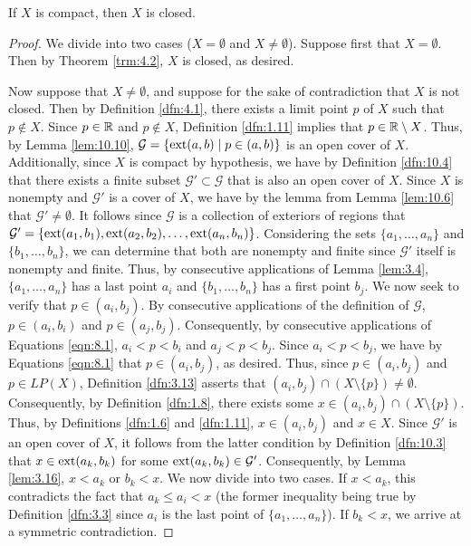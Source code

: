 \documentclass[../main.tex]{subfiles}
\begin{document}
\begin{theorem}\label{trm:10.11}
    If $X$ is compact, then $X$ is closed.
    \begin{proof}
        We divide into two cases ($X=\emptyset$ and $X\neq\emptyset$). Suppose first that $X=\emptyset$. Then by Theorem \ref{trm:4.2}, $X$ is closed, as desired.\par
        Now suppose that $X\neq\emptyset$, and suppose for the sake of contradiction that $X$ is not closed. Then by Definition \ref{dfn:4.1}, there exists a limit point $p$ of $X$ such that $p\notin X$. Since $p\in\mathbb{R}$ and $p\notin X$, Definition \ref{dfn:1.11} implies that $p\in\mathbb{R}\setminus X$. Thus, by Lemma \ref{lem:10.10}, $\mathcal{G}=\{\operatorname{ext}(a,b)\mid p\in(a,b)\}$ is an open cover of $X$. Additionally, since $X$ is compact by hypothesis, we have by Definition \ref{dfn:10.4} that there exists a finite subset $\mathcal{G}'\subset\mathcal{G}$ that is also an open cover of $X$. Since $X$ is nonempty and $\mathcal{G}'$ is a cover of $X$, we have by the lemma from Lemma \ref{lem:10.6} that $\mathcal{G}'\neq\emptyset$. It follows since $\mathcal{G}$ is a collection of exteriors of regions that $\mathcal{G}'=\{\operatorname{ext}(a_1,b_1),\operatorname{ext}(a_2,b_2),\dots,\operatorname{ext}(a_n,b_n)\}$. Considering the sets $\{a_1,\dots,a_n\}$ and $\{b_1,\dots,b_n\}$, we can determine that both are nonempty and finite since $\mathcal{G}'$ itself is nonempty and finite. Thus, by consecutive applications of Lemma \ref{lem:3.4}, $\{a_1,\dots,a_n\}$ has a last point $a_i$ and $\{b_1,\dots,b_n\}$ has a first point $b_j$. We now seek to verify that $p\in(a_i,b_j)$. By consecutive applications of the definition of $\mathcal{G}$, $p\in(a_i,b_i)$ and $p\in(a_j,b_j)$. Consequently, by consecutive applications of Equations \ref{eqn:8.1}, $a_i<p<b_i$ and $a_j<p<b_j$. Since $a_i<p<b_j$, we have by Equations \ref{eqn:8.1} that $p\in(a_i,b_j)$, as desired. Thus, since $p\in(a_i,b_j)$ and $p\in LP(X)$, Definition \ref{dfn:3.13} asserts that $(a_i,b_j)\cap(X\setminus\{p\})\neq\emptyset$. Consequently, by Definition \ref{dfn:1.8}, there exists some $x\in(a_i,b_j)\cap(X\setminus\{p\})$. Thus, by Definitions \ref{dfn:1.6} and \ref{dfn:1.11}, $x\in(a_i,b_j)$ and $x\in X$. Since $\mathcal{G}'$ is an open cover of $X$, it follows from the latter condition by Definition \ref{dfn:10.3} that $x\in\operatorname{ext}(a_k,b_k)$ for some $\operatorname{ext}(a_k,b_k)\in\mathcal{G}'$. Consequently, by Lemma \ref{lem:3.16}, $x<a_k$ or $b_k<x$. We now divide into two cases. If $x<a_k$, this contradicts the fact that $a_k\leq a_i<x$ (the former inequality being true by Definition \ref{dfn:3.3} since $a_i$ is the last point of $\{a_1,\dots,a_n\}$). If $b_k<x$, we arrive at a symmetric contradiction.
    \end{proof}
\end{theorem}
\end{document}
